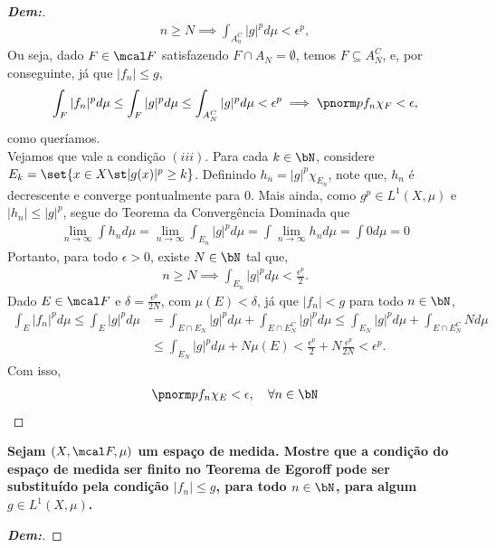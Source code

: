 \begin{proof}[\textbf{Dem:}]
\begin{align*}
    n \ge N \implies \int_{A_n^C} |g|^p d\mu < \epsilon^p,
  \end{align*}
  Ou seja, dado $F \in \mcal F$ satisfazendo $F \cap A_N = \emptyset$, temos 
  $F \subseteq A_N^C$, e, por conseguinte, já que $|f_n| \le g$, 
  \begin{align*}
    \int_F |f_n|^p d\mu \le \int_F |g|^p d\mu \le \int_{A_N^C} |g|^p d\mu < \epsilon^p
    \implies 
    \pnorm p {f_n \chi_F} < \epsilon,
  \end{align*}
  como queríamos.\\
  Vejamos que vale a condição $(iii)$. Para 
  cada $k \in \bN$, considere $E_k = \set{x \in X \st |g(x)|^p \ge k}$.
  Definindo $h_n = |g|^p \chi_{E_n}$, note que, $h_n$ é decrescente 
  e converge pontualmente para $0$. Mais ainda, como $g^p \in L^1(X, \mu)$
  e $|h_n| \le |g|^p$, segue do Teorema da Convergência Dominada que 
  \begin{align*}
    \lim_{n \rightarrow \infty} \int h_n d\mu 
    = \lim_{n \rightarrow \infty} \int_{E_n} |g|^p d\mu 
    = \int \lim_{n \rightarrow \infty} h_n d\mu = \int 0 d\mu = 0
  \end{align*}
  Portanto, para todo $\epsilon> 0$, existe $N \in \bN$ tal que, 
  \begin{align*}
    n \ge N \implies \int_{E_n} |g|^p d\mu < \frac{\epsilon^p}{2}.
  \end{align*}
  Dado $E \in \mcal F$ e $\delta = \frac{\epsilon^p}{2N}$, com $\mu(E)<\delta$,
  já que $|f_n|<g$ para todo $n \in \bN$,
  \begin{align*}
    \int_E |f_n|^p d\mu \le\int_E |g|^p d\mu &= \int_{E \cap E_N} |g|^p d\mu
    +  \int_{E \cap E_N^C} |g|^p d\mu \le  \int_{E_N} |g|^p d\mu +
     \int_{E\cap E_N^C} N d\mu\\
     &\le \int_{E_N} |g|^p d\mu + N\mu(E) < \frac{\epsilon^p}{2} + N \frac{\epsilon^p}{2N}
     < \epsilon^p.
  \end{align*}
  Com isso, 
  \begin{align*}
    \pnorm p {f_n\chi_E} < \epsilon, \quad \forall n \in \bN
  \end{align*}
\end{proof}

\textbf{Sejam $(X, \mcal F, \mu)$ um espaço de medida. Mostre que a condição do 
espaço de medida ser finito no Teorema de Egoroff pode ser substituído 
pela condição $|f_n| \le g$, para todo $n \in \bN$, para algum $g \in L^1(X, \mu)$.}
\begin{proof}[\textbf{Dem:}]
  
\end{proof}

